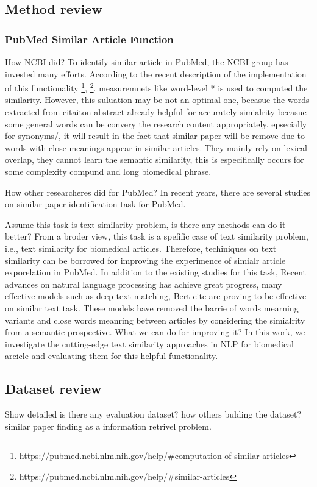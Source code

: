 \documentclass[11pt]{article}
\begin{document}
    \subsection{Method review}
    \subsubsection{PubMed Similar Article Function}
    How NCBI did?
    To identify similar article in PubMed, the NCBI group has invested many efforts. According to the recent description of the implementation of this functionality \footnote{https://pubmed.ncbi.nlm.nih.gov/help/#computation-of-similar-articles}, \footnote{https://pubmed.ncbi.nlm.nih.gov/help/#similar-articles}.
    measuremnets like word-level * is used to computed the similarity. However, this suluation may be not an optimal one, becasue the words extracted from citaiton abstract already helpful for accurately simialrity becasue some general words can be convery the research content appropriately.
    epsecially for synonyms/, it will result in the fact that similar paper will be remove due to words with close meanings appear in similar articles. They mainly rely on lexical overlap, they cannot learn the semantic similarity, this is especifically occurs for some complexity compund and long biomedical phrase.

    How other researcheres did for PubMed?
    In recent years, there are several studies on similar paper identification task for PubMed.

    Assume this task is text similarity problem, is there any methods can do it better?
    From a broder view, this task is a spefific case of text similarity problem, i.e., text similarity for biomedical articles. Therefore, techiniques on text similarity can be borrowed for improving the experimence of simialr article exporelation in PubMed.
    In addition to the existing studies for this task, Recent advances on natural language processing has achieve great progress, many effective models such as deep text matching, Bert cite are proving to be effective on similar text task.
    These models have removed the barrie of words mearning variants and close words meanring between articles by considering the simialrity from a semantic prospective.
    What we can do for improving it?
    In this work, we investigate the cutting-edge text similarity approaches in NLP for biomedical arcicle and evaluating them for this helpful functionality.

    \subsection{Dataset review}
    Show detailed is there any evaluation dataset?
    how others bulding the dataset?
    similar paper finding as a information retrivel problem.
\end{document}
